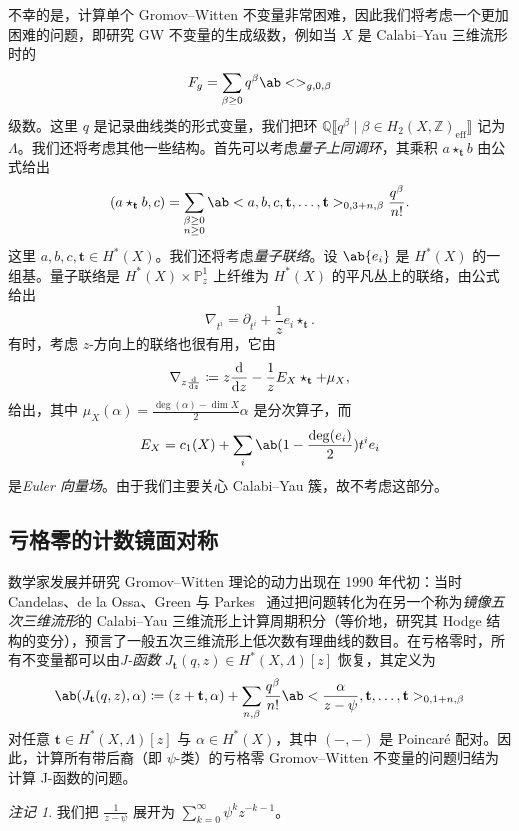 \documentclass{amsart}
\theoremstyle{definition}
\theoremstyle{remark}
\newtheorem{rmk}[thm]{注记}
\theoremstyle{plain}
\theoremstyle{definition}
\theoremstyle{remark}
\newcommand{\Z}{\mathbb{Z}}
\newcommand{\Q}{\mathbb{Q}}
\renewcommand{\P}{\mathbb{P}}
\newcommand{\mbf}[1]{\mathbf{#1}}
\newcommand{\mr}[1]{\mathrm{#1}}
\newcommand{\1}{\mathbf{1}}
\newcommand{\2}{\mathbf{2}}
\newcommand{\3}{\mathbf{3}}
\newcommand{\ps}[1]{\llbracket #1 \rrbracket}
\begin{document}
不幸的是，计算单个 Gromov--Witten 不变量非常困难，因此我们将考虑一个更加困难的问题，即研究 GW 不变量的生成级数，例如当 \(X\) 是 Calabi--Yau 三维流形时的
\[ F_g = \sum_{\beta \geq 0} q^{\beta} \ab<>_{g,0,\beta} \]
级数。这里 \(q\) 是记录曲线类的形式变量，我们把环 \(\Q\ps{q^{\beta} \mid \beta \in H_2(X, \Z)_{\mr{eff}}}\) 记为 \(\Lambda\)。我们还将考虑其他一些结构。首先可以考虑\textit{量子上同调环}，其乘积 \(a \star_{\mbf{t}} b\) 由公式给出
\[
    (a \star_{\mbf{t}} b, c) = \sum_{\substack{\beta \geq 0 \\ n \geq 0}} \ab<a,b,c, \mbf{t}, \ldots, \mbf{t}>_{0,3+n,\beta} \frac{q^{\beta}}{n!}.
\]
这里 \(a,b,c, \mbf{t} \in H^*(X)\)。我们还将考虑\textit{量子联络}。设 \(\ab\{ e_i \}\) 是 \(H^*(X)\) 的一组基。量子联络是 \(H^*(X) \times \P^1_z\) 上纤维为 \(H^*(X)\) 的平凡丛上的联络，由公式给出
\[ \nabla_{t^i} = \partial_{t^i} + \frac{1}{z} e_i \star_{\mbf{t}}. \]
有时，考虑 \(z\)-方向上的联络也很有用，它由
\[ \nabla_{z \odv{}{z}} \coloneqq z \odv{}{z} - \frac{1}{z} E_X \star_{\mbf{t}} + \mu_X, \]
给出，其中 \(\mu_X(\alpha) = \frac{\deg(\alpha) - \dim X}{2} \alpha\) 是分次算子，而
\[ E_X = c_1(X) + \sum_i \ab(1 - \frac{\deg(e_i)}{2})t^i e_i \]
是\textit{Euler 向量场}。由于我们主要关心 Calabi--Yau 簇，故不考虑这部分。

\subsection{亏格零的计数镜面对称}%
\label{sub:Enumerative mirror symmetry in genus zero}

数学家发展并研究 Gromov--Witten 理论的动力出现在 1990 年代初：当时 Candelas、de la Ossa、Green 与 Parkes~\cite{CandelasEtAl1991} 通过把问题转化为在另一个称为\textit{镜像五次三维流形}的 Calabi--Yau 三维流形上计算周期积分（等价地，研究其 Hodge 结构的变分），预言了一般五次三维流形上低次数有理曲线的数目。在亏格零时，所有不变量都可以由\textit{J-函数} \(J_{\mbf{t}}(q,z) \in H^*(X, \Lambda)[z]\) 恢复，其定义为
\[ \ab( J_{\mbf{t}}(q, z), \alpha ) \coloneqq (z + \mbf{t}, \alpha) + \sum_{n, \beta} \frac{q^{\beta}}{n!} \ab< \frac{\alpha}{z-\psi}, \mbf{t}, \ldots, \mbf{t}>_{0,1+n, \beta} \]
对任意 \(\mbf{t} \in H^*(X, \Lambda)[z]\) 与 \(\alpha \in H^*(X)\)，其中 \((-,-)\) 是 Poincar\'e 配对。因此，计算所有带后裔（即 \(\psi\)-类）的亏格零 Gromov--Witten 不变量的问题归结为计算 J-函数的问题。

\begin{rmk}
    我们把 \(\frac{1}{z-\psi}\) 展开为 \(\sum_{k=0}^{\infty} \psi^k z^{-k-1}\)。
\end{rmk}
\end{document}
